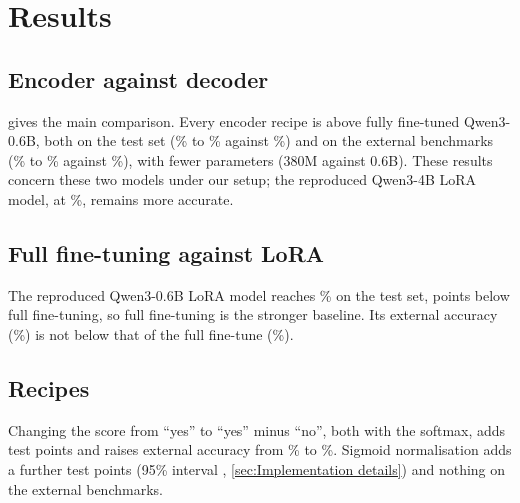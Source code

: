 \section{Results}
\label{sec:results}

\subsection{Encoder against decoder}

 gives the main comparison.
Every encoder recipe is above fully fine-tuned Qwen3-0.6B, both on the test set (\TestUbList{}\% to \TestUbSig{}\% against \TestQwFull{}\%) and on the external benchmarks (\ExtUbList{}\% to \ExtUbYesNo{}\% against \ExtQwFull{}\%), with fewer parameters (380M against 0.6B).
These results concern these two models under our setup; the reproduced Qwen3-4B LoRA model, at \TestQwFourLora{}\%, remains more accurate.

\begin{table}[t]
  \centering\small
  \caption{Matched comparison: average accuracy (\%) over training runs. Test ALL is on the test set;
  Dev ALL and External are on the dev set and the six external benchmarks. Learning rates were chosen on
  dev. Bold: best below 1B parameters.}
  \label{tab:headline}
  
\end{table}

\subsection{Full fine-tuning against LoRA}

The reproduced Qwen3-0.6B LoRA model reaches \TestQwLora{}\% on the test set, \DiffQwFullQwLoraAbs{} points below full fine-tuning, so full fine-tuning is the stronger baseline.
Its external accuracy (\ExtQwLora{}\%) is not below that of the full fine-tune (\ExtQwFull{}\%).

\subsection{Recipes}

Changing the score from ``yes'' to ``yes'' minus ``no'', both with the softmax, adds \DiffUbYesNoUbListAbs{} test points and raises external accuracy from \ExtUbList{}\% to \ExtUbYesNo{}\%.
Sigmoid normalisation adds a further \DiffUbSigUbYesNoAbs{} test points (95\% interval \DiffUbSigUbYesNoCI{}, \cref{sec:Implementation details}) and nothing on the external benchmarks.

